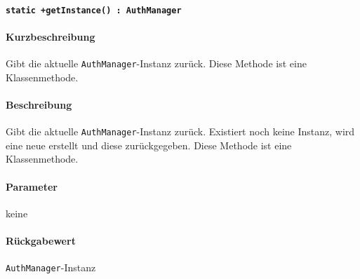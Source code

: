 \paragraph{\texttt{static +getInstance() : AuthManager}}%
\paragraph*{Kurzbeschreibung}
Gibt die aktuelle \verb#AuthManager#-Instanz zurück.
Diese Methode ist eine Klassenmethode.
\paragraph*{Beschreibung}
Gibt die aktuelle \verb#AuthManager#-Instanz zurück.
Existiert noch keine Instanz, wird eine neue erstellt und diese zurückgegeben.
Diese Methode ist eine Klassenmethode.
\paragraph*{Parameter}
keine
\paragraph*{Rückgabewert}
\verb#AuthManager#-Instanz